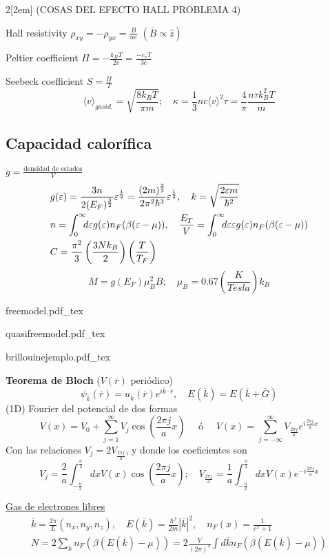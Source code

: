 \documentclass[leqno]{article}
\newcommand{\incfig}[1]{%
\begin{center}
\def\svgwidth{0.9\columnwidth}
{#1.pdf_tex}
\end{center}
}
\begin{document}
\begin{multicols}{2}[\columnsep2em]
(COSAS DEL EFECTO HALL PROBLEMA 4)

Hall resistivity $\rho _{xy}=-\rho_{yx} = \frac{B}{ne}$ $(\overline{B}\propto \hat{z} )$

Peltier coefficient $\Pi = -\frac{k_BT}{2e}= \frac{-c_vT}{3e}$

Seebeck coefficient $S = \frac{\Pi}{T}$
\[
  \langle v\rangle_{gas id.} = \sqrt{\frac{8k_BT}{\pi m}} ; \quad \kappa = \frac{1}{3} nc\langle v\rangle ^2\tau = \frac{4}{\pi }\frac{n\tau k_B^2T}{m}
\] 
\subsection{Capacidad calorífica}
$g = \frac{\text{densidad de estados}}{V}$
\begin{align*}
  &g(\varepsilon ) = \frac{3n}{2(E_F)^{\frac{3}{2}}}\varepsilon ^{\frac{1}{2}} = \frac{(2m)^{\frac{3}{2}}}{2\pi ^2\hbar ^3}\varepsilon ^{\frac{1}{2}} , \quad k = \sqrt{\frac{2\varepsilon m}{\hbar ^2}}  \\
  & n = \int_0^\infty \hspace{-0.5em} d\varepsilon g(\varepsilon )n_F(\beta (\varepsilon -\mu )), \quad
  \frac{E_T}{V} = \int_0^\infty \hspace{-0.5em} d\varepsilon \varepsilon g(\varepsilon )n_F(\beta (\varepsilon -\mu ))\\
  & C = \frac{\pi ^2}{3}\left( \frac{3Nk_B}{2} \right) \left( \frac{T}{T_F} \right)
\end{align*}
\[
\overline{M} = g(E_F)\mu _B^2 \overline{B}; \quad \mu _B = 0.67 \left( \frac{K}{Tesla} \right) k_B
\] 
\incfig{freemodel}
\incfig{quasifreemodel}
\incfig{brillouinejemplo}

\textbf{Teorema de Bloch} ($V(\overline{r})$ periódico)
\[
  \psi _{\overline{k}} (\overline{r}) = u_{\overline{k}}(\overline{r})e^{i \overline{k}\cdot \overline{r}}, \quad E(\overline{k}) = E(\overline{k}+\overline{G})
\] 
(1D) Fourier del potencial de dos formas
\[
V(x)=V_0 + \sum _{j=1}^\infty V_j\cos\left( \frac{2\pi j}{a}x \right)  \quad \text{ ó } \quad 
V(x)=\sum_{j=-\infty}^\infty V_{\frac{2\pi j}{a}} e ^{i\frac{2\pi j}{a}x}
\]
Con las relaciones $V_j = 2 V_{\frac{2\pi j}{a}}$, y donde los coeficientes son
\[ V_j = \frac{2}{a} \int _{-\frac{a}{2}} ^{\frac{a}{2}} dx V(x)\cos\left( \frac{2\pi j}{a}x \right); \quad V_{\frac{2\pi j}{a}} = \frac{1}{a} \int _{-\frac{a}{2}} ^{\frac{a}{2}} dx V(x)e ^{-i\frac{2\pi j }{a}x}
\]

\underline{Gas de electrones libres}
\begin{align*}
\overline{k}=\frac{2\pi}{L}(n_x, n_y, n_z), \quad E(\overline{k})=\frac{\hbar ^2}{2m}|\overline{k}|^2, \quad n_F(x)=\frac{1}{e^x+1}\\
N = 2\sum_{\overline{k}} n_F(\beta(E(\overline{k})- \mu)) = 2 \frac{V}{(2\pi)^3}\int d \overline{k}n_F(\beta (E( \overline{k})-\mu))
\end{align*}


\end{multicols}
\end{document}
